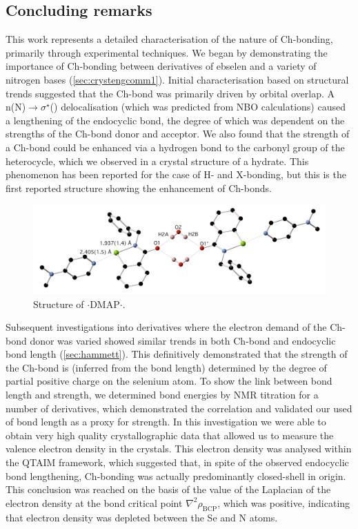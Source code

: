 \begin{refsection}
\chapter{Concluding remarks}
This work represents a detailed characterisation of the nature of Ch-bonding, primarily through experimental techniques.
We began by demonstrating the importance of Ch-bonding between derivatives of ebselen  and a variety of nitrogen bases (\cref{sec:crystengcomm1}).
Initial characterisation based on structural trends suggested that the Ch-bond was primarily driven by orbital overlap.
A n(N)$ \rightarrow \sigma^{\star} $() delocalisation (which was predicted from NBO calculations) caused a lengthening of the endocyclic  bond, the degree of which was dependent on the strengths of the Ch-bond donor and acceptor.
We also found that the strength of a Ch-bond could be enhanced via a hydrogen bond to the carbonyl group of the heterocycle, which we observed in a crystal structure of a hydrate.
This phenomenon has been reported for the case of H- and X-bonding\autocite{Riel2019,Gilli1994}, but this is the first reported structure showing the enhancement of Ch-bonds.

\begin{figure}
    \centering
    \includegraphics[width=0.8\linewidth]{Figures/benzyl-dmap-hydrate.pdf}
    \caption{Structure of $ \cdot $DMAP$ \cdot $.}
  \end{figure}

Subsequent investigations into derivatives where the electron demand of the Ch-bond donor was varied showed similar trends in both Ch-bond and endocyclic bond length (\cref{sec:hammett}).
This definitively demonstrated that the strength of the Ch-bond is (inferred from the bond length) determined by the degree of partial positive charge on the selenium atom.
To show the link between bond length and strength, we determined bond energies by NMR titration for a number of derivatives, which demonstrated the correlation and validated our used of bond length as a proxy for strength.
In this investigation we were able to obtain very high quality crystallographic data that allowed us to measure the valence electron density in the crystals.
This electron density was analysed within the QTAIM framework, which suggested that, in spite of the observed endocyclic bond lengthening, Ch-bonding was actually predominantly closed-shell in origin.
This conclusion was reached on the basis of the value of the Laplacian of the electron density at the bond critical point $\nabla^2 \rho_{\text{BCP}}$, which was positive, indicating that electron density was depleted between the Se and N atoms.


\end{refsection}
